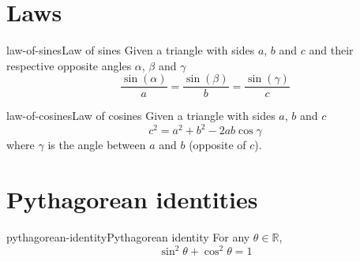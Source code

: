 \documentclass[preview]{standalone}
\begin{document}
\genpage

\section{Laws}

\begin{snippettheorem}{law-of-sines}{Law of sines}
    Given a triangle with sides \(a\), \(b\) and \(c\) and their respective opposite angles
    \(\alpha\), \(\beta\) and \(\gamma\)
    \[
        \frac{\sin(\alpha)}{a} =
        \frac{\sin(\beta)}{b} =
        \frac{\sin(\gamma)}{c}
    \]
\end{snippettheorem}

\begin{snippettheorem}{law-of-cosines}{Law of cosines}
    Given a triangle with sides \(a\), \(b\) and \(c\)
    \[
        c^2 = a^2 + b^2 - 2ab\cos\gamma
    \]
    where \(\gamma\) is the angle between \(a\) and \(b\) (opposite of \(c\)).
\end{snippettheorem}

\section{Pythagorean identities}

\begin{snippettheorem}{pythagorean-identity}{Pythagorean identity}
    For any \(\theta \in \mathbb{R}\),
    \[
        \sin^2\theta + \cos^2\theta = 1
    \]
\end{snippettheorem}
\end{document}
